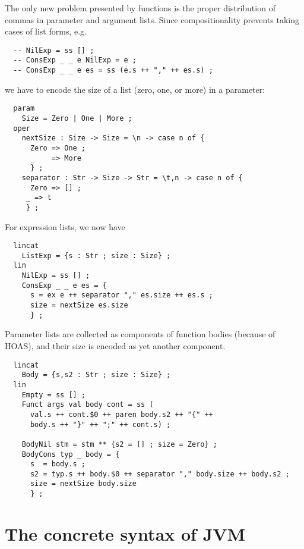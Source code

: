 \documentclass[12pt]{article}
\begin{document}
The only new problem presented by functions is the proper
distribution of commas in parameter and argument lists.
Since compositionality prevents taking cases of list forms, e.g.
\begin{verbatim}
  -- NilExp = ss [] ;
  -- ConsExp _ _ e NilExp = e ;
  -- ConsExp _ _ e es = ss (e.s ++ "," ++ es.s) ;
\end{verbatim}
we have to encode the size of a list (zero, one, or more) in a parameter:
\begin{verbatim}
  param
    Size = Zero | One | More ;
  oper
    nextSize : Size -> Size = \n -> case n of {
      Zero => One ;
      _    => More
      } ;
    separator : Str -> Size -> Str = \t,n -> case n of {
      Zero => [] ;
     _ => t
     } ;
\end{verbatim}
For expression lists, we now have
\begin{verbatim}
  lincat 
    ListExp = {s : Str ; size : Size} ;
  lin
    NilExp = ss [] ;
    ConsExp _ _ e es = {
      s = ex e ++ separator "," es.size ++ es.s ;
      size = nextSize es.size
      } ;
\end{verbatim}
Parameter lists are collected as components of function bodies
(because of HOAS), and their size is encoded as yet another 
component.
\begin{verbatim}
  lincat
    Body = {s,s2 : Str ; size : Size} ;
  lin
    Empty = ss [] ;
    Funct args val body cont = ss (
      val.s ++ cont.$0 ++ paren body.s2 ++ "{" ++ 
      body.s ++ "}" ++ ";" ++ cont.s) ;

    BodyNil stm = stm ** {s2 = [] ; size = Zero} ;
    BodyCons typ _ body = {
      s  = body.s ; 
      s2 = typ.s ++ body.$0 ++ separator "," body.size ++ body.s2 ;
      size = nextSize body.size
      } ;
\end{verbatim}



\section{The concrete syntax of JVM}
\end{document}
